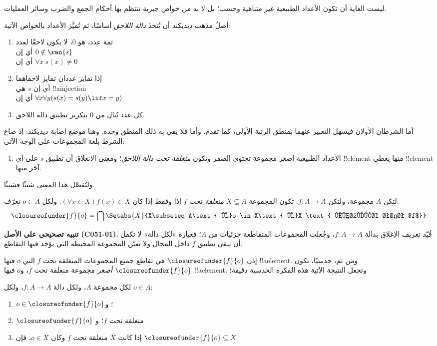 \documentclass[../../../include/open-logic-section]{subfiles}
\begin{document}

ليست الغاية أن تكون الأعداد الطبيعية غير متناهية وحسب؛ بل لا بد من خواص جبرية تنتظم بها أحكام الجمع والضرب وسائر العمليات.

أصلُ مذهب ديديكند أن تُتخذ \emph{دالة اللاحق} أساسًا، ثم تُميَّز الأعداد بالخواص الآتية:
\begin{enumerate}
	\item ثمة عدد، هو $0$، لا يكون لاحقًا لعدد
	\\أي إن $0 \notin \ran{s}$
	\\أي إن $\forall x\ s(x) \neq 0$
	\item إذا تمايز عددان تمايز لاحقاهما
	\\أي إن $s$ هي !!a{injection}
	\\أي إن $\forall x \forall y (s(x) = s(y) \lif x = y)$
	\item{} كل عدد يُنال من
	$0$ بتكرير تطبيق دالة اللاحق.
\end{enumerate}
أما الشرطان الأولان فيسهل التعبير عنهما بمنطق الرتبة الأولى، كما تقدم. وأما  فلا يفي به ذلك المنطق وحده. وهنا موضع إصابة ديديكند: إذ صاغ الشرط
 بلغة المجموعات على الوجه الآتي:
\begin{enumerate}
	\item[3$'$.] الأعداد الطبيعية أصغر مجموعة تحتوي الصفر وتكون
	\emph{منغلقة تحت دالة اللاحق}؛ ومعنى الانغلاق أن تطبيق $s$ على أي
	!!{element} منها يعطي !!{element} آخر منها.
\end{enumerate}
ولنُفصِّل هذا المعنى شيئًا فشيئًا.

\begin{defn}
	لتكن $A$ مجموعة، ولتكن $f\colon A\to A$. تكون المجموعة
	$X\subseteq A$ \emph{منغلقة} تحت $f$ {إذا وفقط إذا} كان
	$(\forall x \in X)f(x) \in X$. ولكل $o\in A$ نعرّف:
	$$\closureofunder{f}{o} = \bigcap\Setabs{X}{X\subseteq A\text{ و}o \in X\text{ و}X
	\text{ منغلقة تحت $f$}}$$
\end{defn}

\textbf{تنبيه تصحيحي على الأصل (C051-01).} قُيّد تعريف الإغلاق بدالة
$f\colon A\to A$، وجُعلت المجموعات المتقاطعة جزئيات من $A$؛ فعبارة
«لكل دالة» لا تكفل أن يبقى تطبيق $f$ داخل المجال ولا تعيّن المجموعة
المحيطة التي يؤخذ فيها التقاطع.

إذن $\closureofunder{f}{o}$ هي تقاطع جميع المجموعات المنغلقة تحت $f$
التي $o$ فيها !!a{element}. ومن ثم، حدسيًا، تكون
$\closureofunder{f}{o}$ \emph{أصغر} مجموعة منغلقة تحت $f$، و$o$ فيها
!!a{element}. وتجعل النتيجة الآتية هذه الفكرة الحدسية دقيقة؛
\begin{lem}
	لكل مجموعة $A$، ولكل دالة $f\colon A\to A$، ولكل $o \in A$:
	\begin{enumerate}
		\item{} $o \in \closureofunder{f}{o}$؛ و
		\item{} $\closureofunder{f}{o}$ منغلقة تحت $f$؛ و
		\item{} إذا كانت $X$ منغلقة تحت $f$ وكان $o \in
		X$، فإن $\closureofunder{f}{o} \subseteq X$
	\end{enumerate}
\end{lem}
\end{document}
